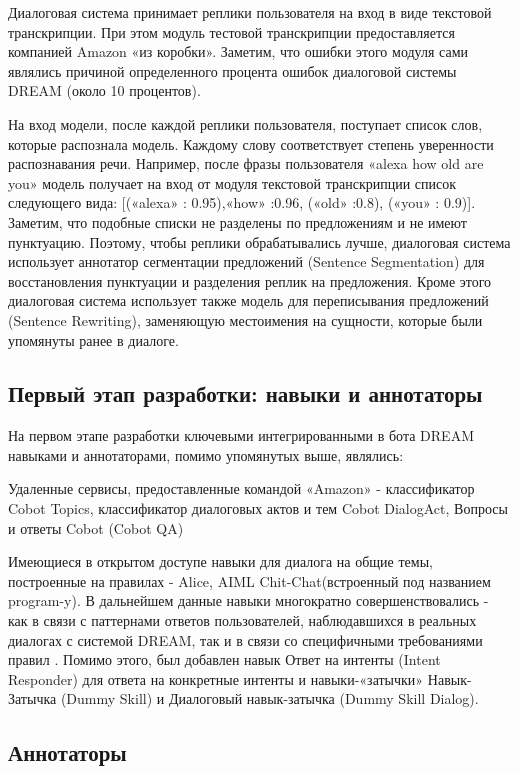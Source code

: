 Диалоговая система принимает реплики пользователя на вход в виде текстовой транскрипции. При этом модуль тестовой транскрипции предоставляется компанией Amazon «из коробки». Заметим, что ошибки этого модуля сами являлись причиной определенного процента ошибок диалоговой системы DREAM (около 10 процентов).

На вход модели, после каждой реплики пользователя, поступает список слов, которые распознала модель. Каждому слову соответствует степень уверенности распознавания речи. Например, после фразы пользователя «alexa how old are you» модель получает на вход от модуля текстовой транскрипции список следующего вида: [(«alexa» : 0.95),«how» :0.96, («old» :0.8), («you» : 0.9)]. Заметим, что подобные списки не разделены по предложениям и не имеют пунктуацию. Поэтому, чтобы реплики обрабатывались лучше, диалоговая система использует аннотатор сегментации предложений (Sentence Segmentation) для восстановления пунктуации и разделения реплик на предложения. Кроме этого диалоговая система использует также модель для переписывания предложений (Sentence Rewriting), заменяющую местоимения на сущности, которые были упомянуты ранее в диалоге.


\subsection{Первый этап разработки: навыки и аннотаторы}

На первом этапе разработки ключевыми интегрированными в бота {DREAM} навыками и аннотаторами, помимо упомянутых выше, являлись:

Удаленные сервисы, предоставленные командой «Amazon» -  классификатор Cobot Topics, классификатор диалоговых актов и тем Cobot DialogAct, Вопросы и ответы Cobot (Cobot QA)

Имеющиеся в открытом доступе навыки для диалога на общие темы, построенные на правилах - Alice, AIML Chit-Chat(встроенный под названием program-y). В дальнейшем данные навыки многократно совершенствовались - как в связи с паттернами ответов пользователей, наблюдавшихся в реальных диалогах с системой DREAM, так и в связи со специфичными требованиями правил \cite{na_website_ndg}. Помимо этого, был добавлен навык Ответ на интенты (Intent Responder) для ответа на конкретные интенты и навыки-«затычки» Навык-Затычка (Dummy Skill) и Диалоговый навык-затычка (Dummy Skill Dialog).

\subsection{Аннотаторы}

